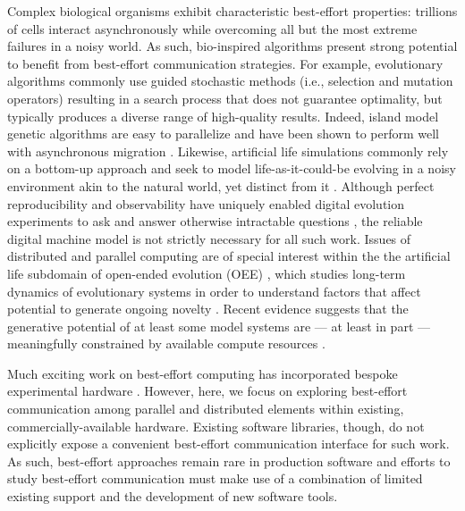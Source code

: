 Complex biological organisms exhibit characteristic best-effort properties: trillions of cells interact asynchronously while overcoming all but the most extreme failures in a noisy world.
As such, bio-inspired algorithms present strong potential to benefit from best-effort communication strategies.
For example, evolutionary algorithms commonly use guided stochastic methods (i.e., selection and mutation operators) resulting in a search process that does not guarantee optimality, but typically produces a diverse range of high-quality results.
Indeed, island model genetic algorithms are easy to parallelize and have been shown to perform well with asynchronous migration \citep{izzo2009parallel}.
Likewise, artificial life simulations commonly rely on a bottom-up approach and seek to model life-as-it-could-be evolving in a noisy environment akin to the natural world, yet distinct from it \citep{bonabeau1994we}. %
Although perfect reproducibility and observability have uniquely enabled digital evolution experiments to ask and answer otherwise intractable questions \citep{pontes2020evolutionary,lenski2003evolutionary,grabowski2013case,dolson2020interpreting,fortuna2019coevolutionary,goldsby2014evolutionary,covert2013experiments,zaman2011rapid,bundy2021footprint,dolson2017spatial}, the reliable digital machine model is not strictly necessary for all such work.
Issues of distributed and parallel computing are of special interest within the the artificial life subdomain of open-ended evolution (OEE) \citep{ackley2014indefinitely}, which studies long-term dynamics of evolutionary systems in order to understand factors that affect potential to generate ongoing novelty \citep{taylor2016open}.
Recent evidence suggests that the generative potential of at least some model systems are --- at least in part --- meaningfully constrained by available compute resources \citep{channon2019maximum}.

Much exciting work on best-effort computing has incorporated bespoke experimental hardware \citep{chippa2014scalable, ackley2011homeostatic, cho2012ersa, chakrapani2008probabilistic, rhodes2020real}.
However, here, we focus on exploring best-effort communication among parallel and distributed elements within existing, commercially-available hardware.
Existing software libraries, though, do not explicitly expose a convenient best-effort communication interface for such work.
As such, best-effort approaches remain rare in production software and efforts to study best-effort communication must make use of a combination of limited existing support and the development of new software tools.

